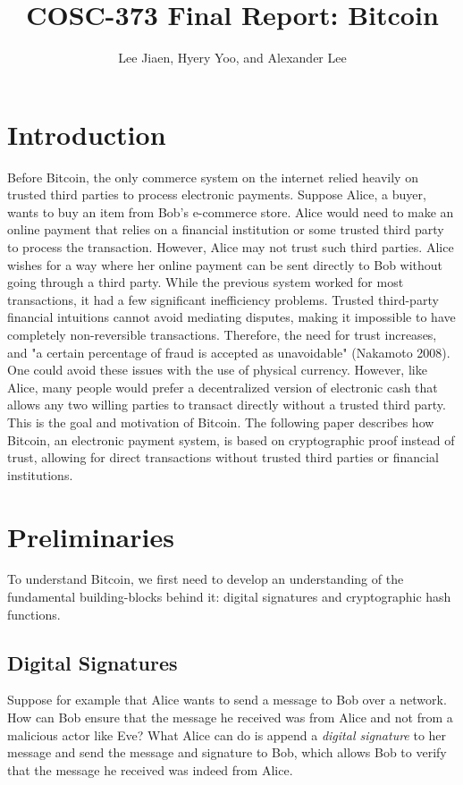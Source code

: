 \documentclass{article}
\title{COSC-373 Final Report: Bitcoin}
\author{Lee Jiaen, Hyery Yoo, and Alexander Lee}
\begin{document}
\maketitle

\section{Introduction}
Before Bitcoin, the only commerce system on the internet relied heavily on trusted third parties to process electronic payments. Suppose Alice, a buyer, wants to buy an item from Bob's e-commerce store. Alice would need to make an online payment that relies on a financial institution or some trusted third party to process the transaction. However, Alice may not trust such third parties. Alice wishes for a way where her online payment can be sent directly to Bob without going through a third party. While the previous system worked for most transactions, it had a few significant inefficiency problems. Trusted third-party financial intuitions cannot avoid mediating disputes, making it impossible to have completely non-reversible transactions. Therefore, the need for trust increases, and "a certain percentage of fraud is accepted as unavoidable" (Nakamoto 2008). One could avoid these issues with the use of physical currency. However, like Alice, many people would prefer a decentralized version of electronic cash that allows any two willing parties to transact directly without a trusted third party. This is the goal and motivation of Bitcoin. The following paper describes how Bitcoin, an electronic payment system, is based on cryptographic proof instead of trust, allowing for direct transactions without trusted third parties or financial institutions.

\section{Preliminaries}

To understand Bitcoin, we first need to develop an understanding of the
fundamental building-blocks behind it: digital signatures and cryptographic hash
functions.

\subsection{Digital Signatures}

Suppose for example that Alice wants to send a message to Bob over a network.
How can Bob ensure that the message he received was from Alice and not from a
malicious actor like Eve? What Alice can do is append a \emph{digital signature}
to her message and send the message and signature to Bob, which allows Bob to
verify that the message he received was indeed from Alice.
\end{document}
